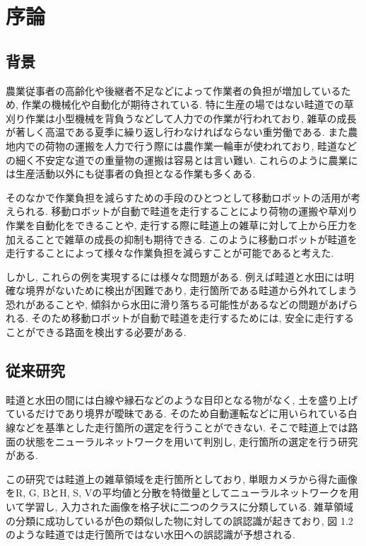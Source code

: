 \chapter{序論}
\section{背景}
農業従事者の高齢化や後継者不足などによって作業者の負担が増加しているため, 作業の機械化や自動化が期待されている. 
特に生産の場ではない畦道での草刈り作業は小型機械を背負うなどして人力での作業が行われており, 雑草の成長が著しく高温である夏季に繰り返し行わなければならない重労働である. 
また農地内での荷物の運搬を人力で行う際には農作業一輪車が使われており, 畦道などの細く不安定な道での重量物の運搬は容易とは言い難い. 
これらのように農業には生産活動以外にも従事者の負担となる作業も多くある.  

そのなかで作業負担を減らすための手段のひとつとして移動ロボットの活用が考えられる. 
移動ロボットが自動で畦道を走行することにより荷物の運搬や草刈り作業を自動化をできることや, 
走行する際に畦道上の雑草に対して上から圧力を加えることで雑草の成長の抑制も期待できる\cite{稲垣栄洋2017踏圧処理が畦畔雑草植生に及ぼす影響}. 
このように移動ロボットが畦道を走行することによって様々な作業負担を減らすことが可能であると考えた. 

しかし, これらの例を実現するには様々な問題がある.  
例えば畦道と水田には明確な境界がないために検出が困難であり, 走行箇所である畦道から外れてしまう恐れがあることや, 
傾斜から水田に滑り落ちる可能性があるなどの問題があげられる. 
そのため移動ロボットが自動で畦道を走行するためには, 安全に走行することができる路面を検出する必要がある.



\section{従来研究}

畦道と水田の間には白線や縁石などのような目印となる物がなく, 土を盛り上げているだけであり境界が曖昧である. 
そのため自動運転などに用いられている白線などを基準とした走行箇所の選定を行うことができない. 
そこで畦道上では路面の状態をニューラルネットワークを用いて判別し, 
走行箇所の選定を行う研究\cite{長橋孝哉2019ニューラルネットワークを用いた畦道の雑草検出に関する研究}がある.  

この研究では畦道上の雑草領域を走行箇所としており, 
単眼カメラから得た画像をR, G, BとH, S, Vの平均値と分散を特徴量としてニューラルネットワークを用いて学習し, 
入力された画像を格子状に二つのクラスに分類している. 
雑草領域の分類に成功しているが色の類似した物に対しての誤認識が起きており, 図 1.2のような畦道では走行箇所ではない水田への誤認識が予想される. 

